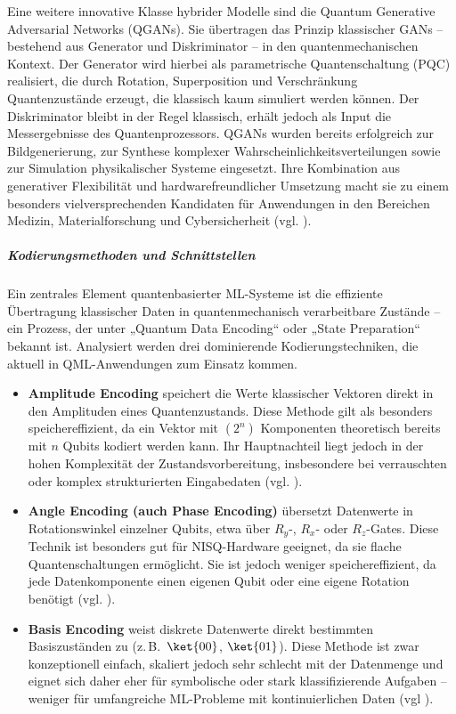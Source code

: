 Eine weitere innovative Klasse hybrider Modelle sind die Quantum Generative Adversarial Networks (QGANs). Sie übertragen das Prinzip klassischer GANs – bestehend aus Generator und Diskriminator – in den quantenmechanischen Kontext. Der Generator wird hierbei als parametrische Quantenschaltung (PQC) realisiert, die durch Rotation, Superposition und Verschränkung Quantenzustände erzeugt, die klassisch kaum simuliert werden können. Der Diskriminator bleibt in der Regel klassisch, erhält jedoch als Input die Messergebnisse des Quantenprozessors. QGANs wurden bereits erfolgreich zur Bildgenerierung, zur Synthese komplexer Wahrscheinlichkeitsverteilungen sowie zur Simulation physikalischer Systeme eingesetzt. Ihre Kombination aus generativer Flexibilität und hardwarefreundlicher Umsetzung macht sie zu einem besonders vielversprechenden Kandidaten für Anwendungen in den Bereichen Medizin, Materialforschung und Cybersicherheit (vgl. \cite{peral-garciaSystematicLiteratureReview2024}).



\subparagraph{Kodierungsmethoden und Schnittstellen}
Ein zentrales Element quantenbasierter ML-Systeme ist die effiziente Übertragung klassischer Daten in quantenmechanisch verarbeitbare Zustände – ein Prozess, der unter „Quantum Data Encoding“ oder „State Preparation“ bekannt ist. Analysiert werden drei dominierende Kodierungstechniken, die aktuell in QML-Anwendungen zum Einsatz kommen.

\begin{itemize}

\item \textbf{Amplitude Encoding} speichert die Werte klassischer Vektoren direkt in den Amplituden eines Quantenzustands.
Diese Methode gilt als besonders speichereffizient, da ein Vektor mit $(2^n)$ Komponenten theoretisch bereits mit $n$ Qubits kodiert werden kann.
Ihr Hauptnachteil liegt jedoch in der hohen Komplexität der Zustandsvorbereitung, insbesondere bei verrauschten oder komplex strukturierten Eingabedaten (vgl. \cite{schuld_supervised_2018}).

\item \textbf{Angle Encoding (auch Phase Encoding)} übersetzt Datenwerte in Rotationswinkel einzelner Qubits, etwa über $R_y$-, $R_x$- oder $R_z$-Gates.
Diese Technik ist besonders gut für NISQ-Hardware geeignet, da sie flache Quantenschaltungen ermöglicht.
Sie ist jedoch weniger speichereffizient, da jede Datenkomponente einen eigenen Qubit oder eine eigene Rotation benötigt (vgl. \cite{schuld_supervised_2018}).

\item \textbf{Basis Encoding} weist diskrete Datenwerte direkt bestimmten Basiszuständen zu (z.\,B.\ $\ket{00}$, $\ket{01}$).
Diese Methode ist zwar konzeptionell einfach, skaliert jedoch sehr schlecht mit der Datenmenge und eignet sich daher eher für symbolische oder stark klassifizierende Aufgaben – weniger für umfangreiche ML-Probleme mit kontinuierlichen Daten (vgl \cite{schuld_supervised_2018}).

\end{itemize}


